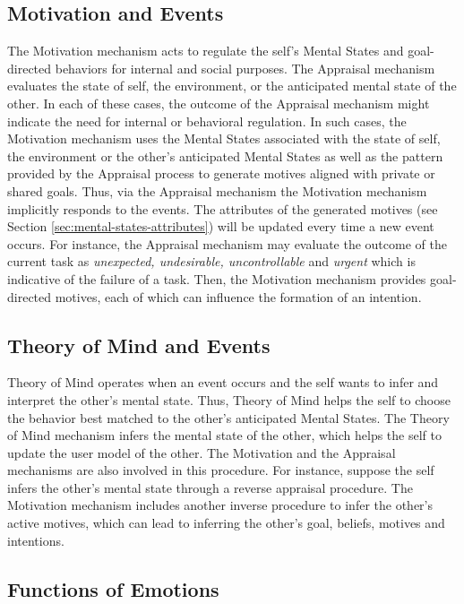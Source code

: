 \documentclass[12pt]{report}
\begin{document}
\subsection{Motivation and Events}
The Motivation mechanism acts to regulate the self's Mental States and
goal-directed behaviors for internal and social purposes. The Appraisal mechanism
evaluates the state of self, the environment, or the anticipated mental state of
the other. In each of these cases, the outcome of the Appraisal mechanism might
indicate the need for internal or behavioral regulation. In such cases, the
Motivation mechanism uses the Mental States associated with the state of self,
the environment or the other's anticipated Mental States as well as the pattern
provided by the Appraisal process to generate motives aligned with private or
shared goals. Thus, via the Appraisal mechanism the Motivation mechanism
implicitly responds to the events. The attributes of the generated motives (see
Section \ref{sec:mental-states-attributes}) will be updated every time a new
event occurs. For instance, the Appraisal mechanism may evaluate the outcome of
the current task as \textit{unexpected, undesirable, uncontrollable} and
\textit{urgent} which is indicative of the failure of a task. Then, the
Motivation mechanism provides goal-directed motives, each of which can
influence the formation of an intention.

\subsection{Theory of Mind and Events}
Theory of Mind operates when an event occurs and the self wants to infer and
interpret the other's mental state. Thus, Theory of Mind helps the self to
choose the behavior best matched to the other's anticipated Mental States.
The Theory of Mind mechanism infers the mental state of the other, which helps
the self to update the user model of the other. The Motivation and the Appraisal
mechanisms are also involved in this procedure. For instance, suppose the self
infers the other's mental state through a reverse appraisal procedure. The
Motivation mechanism includes another inverse procedure to infer the other's
active motives, which can lead to inferring the other's goal, beliefs, motives
and intentions.

\subsection{Functions of Emotions}
\label{sec:emotion-functions}
\end{document}
